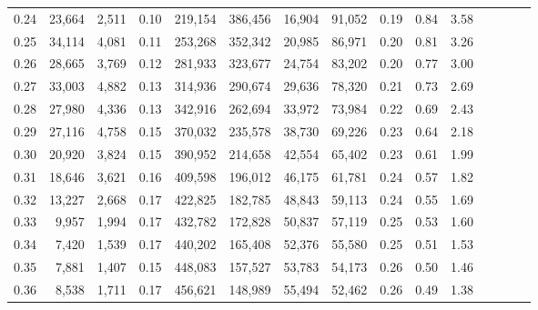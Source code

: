 \begin{tabular}{rrrcrrrrrrrrrrr}
0.24 &  23,664 &  2,511 &                                       0.10 &  219,154 &  386,456 &   16,904 &   91,052 &  0.19 &  0.84 &                         3.58 \\
0.25 &  34,114 &  4,081 &                                       0.11 &  253,268 &  352,342 &   20,985 &   86,971 &  0.20 &  0.81 &                         3.26 \\
0.26 &  28,665 &  3,769 &                                       0.12 &  281,933 &  323,677 &   24,754 &   83,202 &  0.20 &  0.77 &                         3.00 \\
0.27 &  33,003 &  4,882 &                                       0.13 &  314,936 &  290,674 &   29,636 &   78,320 &  0.21 &  0.73 &                         2.69 \\
0.28 &  27,980 &  4,336 &                                       0.13 &  342,916 &  262,694 &   33,972 &   73,984 &  0.22 &  0.69 &                         2.43 \\
0.29 &  27,116 &  4,758 &                                       0.15 &  370,032 &  235,578 &   38,730 &   69,226 &  0.23 &  0.64 &                         2.18 \\
0.30 &  20,920 &  3,824 &                                       0.15 &  390,952 &  214,658 &   42,554 &   65,402 &  0.23 &  0.61 &                         1.99 \\
0.31 &  18,646 &  3,621 &                                       0.16 &  409,598 &  196,012 &   46,175 &   61,781 &  0.24 &  0.57 &                         1.82 \\
0.32 &  13,227 &  2,668 &                                       0.17 &  422,825 &  182,785 &   48,843 &   59,113 &  0.24 &  0.55 &                         1.69 \\
0.33 &   9,957 &  1,994 &                                       0.17 &  432,782 &  172,828 &   50,837 &   57,119 &  0.25 &  0.53 &                         1.60 \\
0.34 &   7,420 &  1,539 &                                       0.17 &  440,202 &  165,408 &   52,376 &   55,580 &  0.25 &  0.51 &                         1.53 \\
0.35 &   7,881 &  1,407 &                                       0.15 &  448,083 &  157,527 &   53,783 &   54,173 &  0.26 &  0.50 &                         1.46 \\
0.36 &   8,538 &  1,711 &                                       0.17 &  456,621 &  148,989 &   55,494 &   52,462 &  0.26 &  0.49 &                         1.38 \\

\end{tabular}
